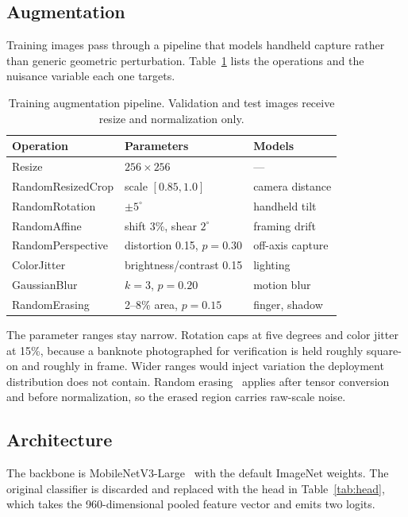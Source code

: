 \documentclass[conference]{IEEEtran}
\begin{document}
\subsection{Augmentation}

Training images pass through a pipeline that models handheld capture rather than
generic geometric perturbation. Table~\ref{tab:aug} lists the operations and the
nuisance variable each one targets.

\begin{table}[t]
\caption{Training augmentation pipeline. Validation and test images receive
resize and normalization only.}
\label{tab:aug}
\centering
\small
\begin{tabular}{@{}lll@{}}
\toprule
\textbf{Operation} & \textbf{Parameters} & \textbf{Models} \\
\midrule
Resize            & $256 \times 256$                & --- \\
RandomResizedCrop & scale $[0.85, 1.0]$             & camera distance \\
RandomRotation    & $\pm 5^{\circ}$                 & handheld tilt \\
RandomAffine      & shift 3\%, shear $2^{\circ}$    & framing drift \\
RandomPerspective & distortion 0.15, $p{=}0.30$     & off-axis capture \\
ColorJitter       & brightness/contrast 0.15        & lighting \\
GaussianBlur      & $k{=}3$, $p{=}0.20$             & motion blur \\
RandomErasing     & 2--8\% area, $p{=}0.15$         & finger, shadow \\
\bottomrule
\end{tabular}
\end{table}

The parameter ranges stay narrow. Rotation caps at five degrees and color jitter
at 15\%, because a banknote photographed for verification is held roughly
square-on and roughly in frame. Wider ranges would inject variation the
deployment distribution does not contain. Random
erasing~\cite{zhong2020randomerasing} applies after tensor conversion and before
normalization, so the erased region carries raw-scale noise.

\subsection{Architecture}

The backbone is MobileNetV3-Large~\cite{howard2019mobilenetv3} with the default
ImageNet weights. The original classifier is discarded and replaced with the
head in Table~\ref{tab:head}, which takes the 960-dimensional pooled feature
vector and emits two logits.
\end{document}
